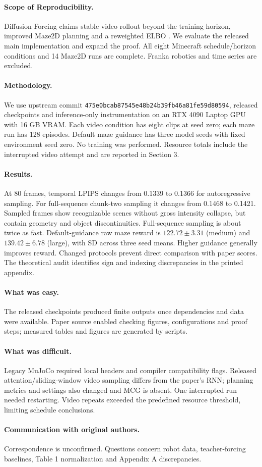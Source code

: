 \paragraph{Scope of Reproducibility.}
Diffusion Forcing claims stable video rollout beyond the training horizon, improved Maze2D planning and a reweighted ELBO \cite{chen2025diffusion}. We evaluate the released main implementation and expand the proof. All eight Minecraft schedule/horizon conditions and 14 Maze2D runs are complete. Franka robotics and time series are excluded.
\paragraph{Methodology.}
We use upstream commit \texttt{475e0bcab87545e48b24b39fb46a81fe59d80594}, released checkpoints and inference-only instrumentation on an RTX 4090 Laptop GPU with 16 GB VRAM. Each video condition has eight clips at seed zero; each maze run has 128 episodes. Default maze guidance has three model seeds with fixed environment seed zero. No training was performed. Resource totals include the interrupted video attempt and are reported in Section 3.
\paragraph{Results.}
At 80 frames, temporal LPIPS changes from 0.1339 to 0.1366 for autoregressive sampling. For full-sequence chunk-two sampling it changes from 0.1468 to 0.1421. Sampled frames show recognizable scenes without gross intensity collapse, but contain geometry and object discontinuities. Full-sequence sampling is about twice as fast. Default-guidance raw maze reward is $122.72\pm3.31$ (medium) and $139.42\pm6.78$ (large), with SD across three seed means. Higher guidance generally improves reward. Changed protocols prevent direct comparison with paper scores. The theoretical audit identifies sign and indexing discrepancies in the printed appendix.
\paragraph{What was easy.}
The released checkpoints produced finite outputs once dependencies and data were available. Paper source enabled checking figures, configurations and proof steps; measured tables and figures are generated by scripts.
\paragraph{What was difficult.}
Legacy MuJoCo required local headers and compiler compatibility flags. Released attention/sliding-window video sampling differs from the paper's RNN; planning metrics and settings also changed and MCG is absent. One interrupted run needed restarting. Video repeats exceeded the predefined resource threshold, limiting schedule conclusions.
\paragraph{Communication with original authors.}
Correspondence is unconfirmed. Questions concern robot data, teacher-forcing baselines, Table 1 normalization and Appendix A discrepancies.
